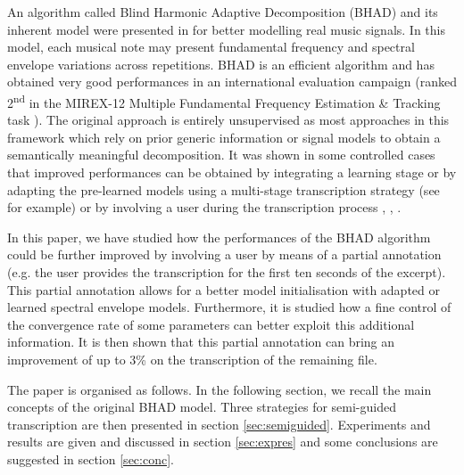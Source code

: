 \documentclass{article}
\begin{document}
\vspace{0.1cm}

An algorithm called Blind Harmonic Adaptive Decomposition (BHAD) and its inherent model were presented in \cite{Fuentes2012_EUSIPCO, Fuentes2013_PhD} for better modelling real music signals. In this model, each musical note may present fundamental frequency and spectral envelope variations across repetitions. BHAD is an efficient algorithm and has obtained very good performances in an international evaluation campaign (ranked 2\textsuperscript{nd} in the MIREX-12 Multiple Fundamental Frequency Estimation \& Tracking task \cite{MIREX2012}). 
The original approach is entirely unsupervised as most approaches in this framework which rely on prior generic information or signal models to obtain a semantically meaningful decomposition. It was shown in some controlled cases that improved performances can be obtained by integrating a learning stage or by adapting the pre-learned models using a multi-stage transcription strategy (see \cite{BenetosISMIR2014} for example) or by involving a user during the transcription process \cite{Kirchhoff13}, \cite{ozerov2012general}, \cite{BryanEtAl_2013_SourSepaOfPoly}.

\vspace{0.1cm}

In this paper, we have studied how the performances of the BHAD algorithm could be further improved by involving a user by means of a partial annotation (e.g. the user provides the transcription for the first ten seconds of the excerpt). This partial annotation allows for a better model initialisation with adapted or learned spectral envelope models. Furthermore, it is studied how a fine control of the convergence rate of some parameters can better exploit this additional information. It is then shown that this partial annotation can bring an improvement of up to 3\% on the transcription of the remaining file.  %

\vspace{0.1cm}
The paper is organised as follows. In the following section, we recall the main concepts of the original BHAD model. Three strategies for semi-guided transcription are then presented in section \ref{sec:semiguided}. Experiments and results are given and discussed in section \ref{sec:expres} and some conclusions are suggested in section \ref{sec:conc}.  
\end{document}
